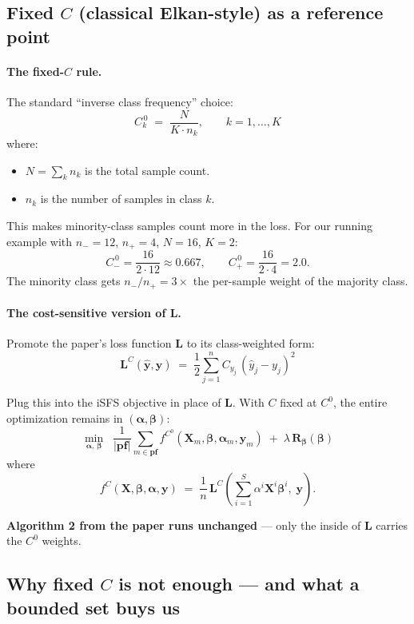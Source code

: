 \documentclass[11pt,a4paper]{article}
\begin{document}
\subsection{Fixed $C$ (classical Elkan-style) as a reference point}

\paragraph{The fixed-$C$ rule.} The standard ``inverse class frequency'' choice:
\[
C_k^{\,0} \;=\; \frac{N}{K \cdot n_k},\qquad k = 1, \ldots, K
\]
where:
\begin{itemize}[leftmargin=*,itemsep=2pt]
  \item $N = \sum_k n_k$ is the total sample count.
  \item $n_k$ is the number of samples in class $k$.
\end{itemize}

This makes minority-class samples count more in the loss. For our running example with $n_- = 12$, $n_+ = 4$, $N = 16$, $K = 2$:
\[
C_-^{\,0} = \frac{16}{2\cdot 12} \approx 0.667,\qquad C_+^{\,0} = \frac{16}{2\cdot 4} = 2.0.
\]
The minority class gets $n_-/n_+ = 3\times$ the per-sample weight of the majority class.

\paragraph{The cost-sensitive version of $\mathbf{L}$.} Promote the paper's loss function $\mathbf{L}$ to its class-weighted form:
\[
\mathbf{L}^{C}(\hat{\mathbf{y}},\mathbf{y}) \;=\; \frac{1}{2}\sum_{j=1}^{n} C_{y_{j}}\,(\hat{y}_{j} - y_{j})^{2}
\]

Plug this into the iSFS objective in place of $\mathbf{L}$. With $C$ fixed at $C^0$, the entire optimization remains in $(\boldsymbol{\alpha}, \boldsymbol{\beta})$:
\[
\min_{\boldsymbol{\alpha},\,\boldsymbol{\beta}}\;\;\frac{1}{|\mathbf{pf}|}\sum_{m \in \mathbf{pf}} f^{C^{0}}(\mathbf{X}_m,\boldsymbol{\beta},\boldsymbol{\alpha}_m,\mathbf{y}_m) \;+\; \lambda\,\mathbf{R}_{\boldsymbol{\beta}}(\boldsymbol{\beta})
\]
where
\[
f^{C}(\mathbf{X},\boldsymbol{\beta},\boldsymbol{\alpha},\mathbf{y}) \;=\; \frac{1}{n}\,\mathbf{L}^{C}\!\left(\sum_{i=1}^{S}\alpha^{i}\mathbf{X}^{i}\boldsymbol{\beta}^{i},\;\mathbf{y}\right).
\]

\textbf{Algorithm 2 from the paper runs unchanged} --- only the inside of $\mathbf{L}$ carries the $C^0$ weights.

\subsection{Why fixed $C$ is not enough --- and what a bounded set buys us}
\end{document}
